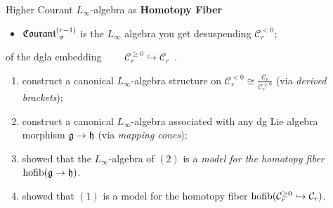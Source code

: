 \documentclass[beamer,10pt,handout]{standalone}  \Handouttrue
\begin{document}



\begin{frame}{Higher Courant $L_\infty$-algebra as \textbf{Homotopy Fiber}}
	\begin{itemize}
		\item $\Courant[\sigma]{r-1}$ is the $L_\infty$ algebra you get desuspending $\mathcal{C}_r^{<0}$;
	\end{itemize}
	\pause
	\vfill

	\begin{propblock} of the dgla embedding $\qquad \mathcal{C}_r^{\geq 0} \hookrightarrow \mathcal{C}_r$~.
	\end{propblock}
	\pause
	\begin{proofblock}
\begin{enumerate}[(1)]
		\item \cite{Getzler1991} construct a canonical $L_\infty$-algebra structure on $\mathcal{C}_r^{<0}\cong \frac{\mathcal{C}_r }{\mathcal{C}_r^{\geq 0}}$ (via \emph{derived brackets});
		\item \cite{Fiorenza2006} construct a canonical $L_\infty$-algebra associated with any dg Lie algebra morphism $\g \to \mathfrak{h}$ (via \emph{mapping cones});
		\item \cite{Pridham2010a} showed that the $L_\infty$-algebra  of $(2)$ is a \emph{model for the homotopy fiber $\hofib(\g \to \mathfrak{h})$}.
		\item \cite{Bandiera2015} showed that $(1)$ is a model for the homotopy fiber $\hofib(\mathcal{C}_r^{\geq 0} \hookrightarrow \mathcal{C}_r)$.
	\end{enumerate}
	\end{proofblock}
 
\end{frame}
\end{document}
